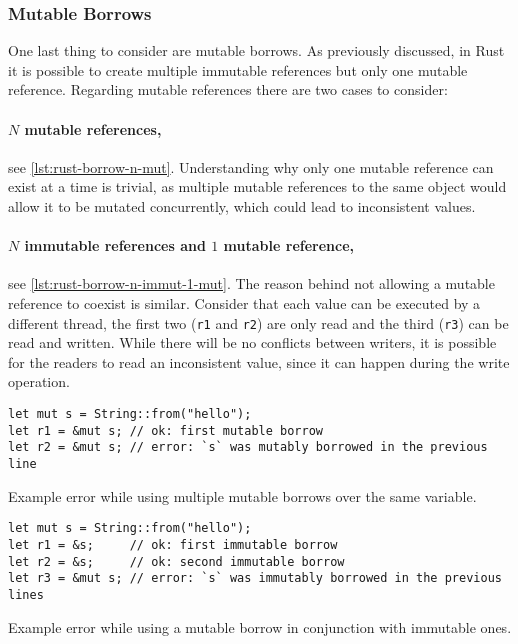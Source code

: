 \subsubsection*{Mutable Borrows}

One last thing to consider are mutable borrows.
As previously discussed, in Rust it is possible to create multiple immutable references but only one mutable reference.
Regarding mutable references there are two cases to consider:

\paragraph{$N$ mutable references,} see \autoref{lst:rust-borrow-n-mut}.
Understanding why only one mutable reference can exist at a time is trivial,
as multiple mutable references to the same object would allow it to be mutated concurrently,
which could lead to inconsistent values.

\paragraph{$N$ immutable references and $1$ mutable reference,} see \autoref{lst:rust-borrow-n-immut-1-mut}.
The reason behind not allowing a mutable reference to coexist is similar.
Consider that each value can be executed by a different thread,
the first two (\texttt{r1} and \texttt{r2}) are only read and the third (\texttt{r3}) can be read and written.
While there will be no conflicts between writers, it is possible for the readers to read an inconsistent value,
since it can happen during the write operation.

\begin{listing}
    \begin{verbatim}
let mut s = String::from("hello");
let r1 = &mut s; // ok: first mutable borrow
let r2 = &mut s; // error: `s` was mutably borrowed in the previous line
    \end{verbatim}
    \caption{Example error while using multiple mutable borrows over the same variable.}
    \label{lst:rust-borrow-n-mut}
\end{listing}

\begin{listing}
    \begin{verbatim}
let mut s = String::from("hello");
let r1 = &s;     // ok: first immutable borrow
let r2 = &s;     // ok: second immutable borrow
let r3 = &mut s; // error: `s` was immutably borrowed in the previous lines
    \end{verbatim}
    \caption{Example error while using a mutable borrow in conjunction with immutable ones.}
    \label{lst:rust-borrow-n-immut-1-mut}
\end{listing}



